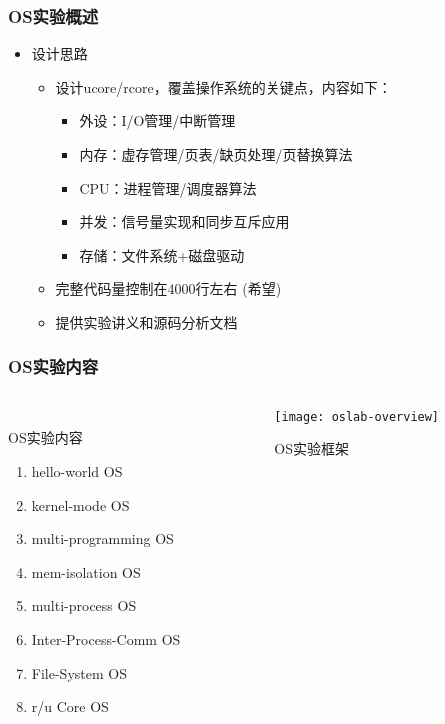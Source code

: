 \begin{frame}

\frametitle{OS实验概述}

\begin{itemize}
\item 设计思路
    \begin{itemize}
    \item 设计ucore/rcore，覆盖操作系统的关键点，内容如下：
    \begin{itemize}
        \item 外设：I/O管理/中断管理
        \item 内存：虚存管理/页表/缺页处理/页替换算法
        \item CPU：进程管理/调度器算法
        \item 并发：信号量实现和同步互斥应用
        \item 存储：文件系统+磁盘驱动
    \end{itemize}
    \item 完整代码量控制在4000行左右 (希望)
    \item 提供实验讲义和源码分析文档
    \end{itemize}
\end{itemize}

\end{frame}


\begin{frame}[plain]
	
	\frametitle{OS实验内容}

	\begin{columns}[t]
    \begin{column}{.5\textwidth}
     \\
     OS实验内容
     
	\begin{enumerate}
	    \item hello-world OS
		\item kernel-mode OS
		\item multi-programming OS	
		\item mem-isolation OS
		\item multi-process OS
		\item Inter-Process-Comm OS
		\item File-System OS
		\item r/u Core OS
	\end{enumerate}
	\end{column}
	
	\begin{column}{.5\textwidth}
	\begin{figure}
		\centering
		\texttt{[image: oslab-overview]}
		\caption{OS实验框架}
	\end{figure}
	\end{column}
	\end{columns}
\end{frame}


